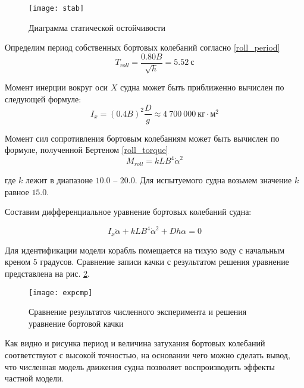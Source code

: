 \begin{figure}[ht]
\begin{center}
\texttt{[image: stab]}
\end{center}
\caption{Диаграмма статической остойчивости}
\label{stab}
\end{figure}

Определим период собственных бортовых колебаний согласно \citep{hanovich47} \eqref{roll_period}
\begin{equation}
	T_{roll} = \frac{0.80B}{\sqrt{h}} = 5.52\ \text{с}
	\label{roll_period}
\end{equation}

Момент инерции вокруг оси $X$ судна может быть приближенно вычислен по следующей формуле:
\begin{equation}
	I_{x} = (0.4B)^2 \frac{D}{g} \approx 4\ 700\ 000\ \text{кг}\cdot \text{м}^2
	\label{roll_torque}
\end{equation}



Момент сил сопротивления бортовым колебаниям может быть вычислен по формуле, полученной Бертеном \eqref{roll_torque}
\begin{equation}
	M_{roll} = kLB^4\dot{\alpha}^2
	\label{roll_torque}
\end{equation}

где $k$ лежит в диапазоне $10.0$ -- $20.0$. Для испытуемого судна возьмем значение $k$ равное $15.0$.

Составим дифференциальное уравнение бортовых колебаний судна:

\begin{equation}
	I_x \ddot{\alpha} + kLB^4\dot{\alpha}^2 + Dh \alpha = 0
	\label{roll_eq}
\end{equation}

Для идентификации модели корабль помещается на тихую воду с начальным креном $5$ градусов. Сравнение записи качки с результатом решения уравнение представлена на рис. \ref{expcmp}.

\begin{figure}[ht]
\begin{center}
\texttt{[image: expcmp]}
\end{center}
\caption{Сравнение результатов численного эксперимента и решения уравнение бортовой качки}
\label{expcmp}
\end{figure}

Как видно и рисунка период и величина затухания бортовых колебаний соответствуют с высокой точностью, на основании чего можно сделать вывод, что численная модель движения судна позволяет воспроизводить эффекты частной модели.

